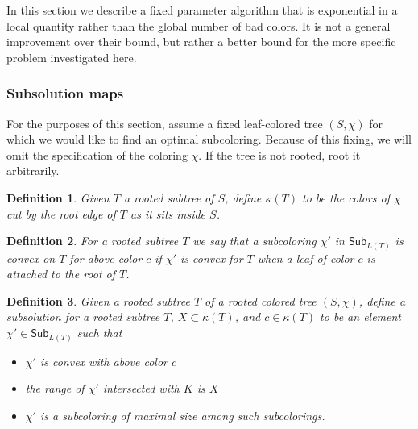 \documentclass{amsart}
\newcommand{\col}{\chi}
\newcommand{\subcol}{\chi'}
\newcommand{\subcolS}{\mathsf{Sub}}
\newcommand{\subcolST}{\subcolS_{L(T)}}
\newcommand{\cut}{\kappa}
\newtheorem{defn}{Definition}
\begin{document}
In this section we describe a fixed parameter algorithm that is exponential in a local quantity rather than the global number of bad colors.
It is not a general improvement over their bound, but rather a better bound for the more specific problem investigated here.


\subsubsection{Subsolution maps}

For the purposes of this section, assume a fixed leaf-colored tree $(S, \col)$ for which we would like to find an optimal subcoloring.
Because of this fixing, we will omit the specification of the coloring $\col$.
If the tree is not rooted, root it arbitrarily.

\begin{defn}
  Given $T$ a rooted subtree of $S$, define $\cut(T)$ to be the colors of $\col$ cut by the root edge of $T$ as it sits inside $S$.
\end{defn}


\begin{defn}
  For a rooted subtree $T$ we say that a subcoloring $\subcol$ in $\subcolST$ is convex on $T$ for above color $c$ if $\subcol$ is convex for $T$ when a leaf of color $c$ is attached to the root of $T$.
\end{defn}

\begin{defn}
  \label{defn:subsolution}
  Given a rooted subtree $T$ of a rooted colored tree $(S, \col)$, define a subsolution for a rooted subtree $T$, $X \subset \cut(T)$, and $c \in \cut(T)$ to be an element $\subcol \in \subcolST$ such that
  \begin{itemize}
    \item $\subcol$ is convex with above color $c$
    \item the range of $\subcol$ intersected with $K$ is $X$
    \item $\subcol$ is a subcoloring of maximal size among such subcolorings.
  \end{itemize}
\end{defn}
\end{document}
